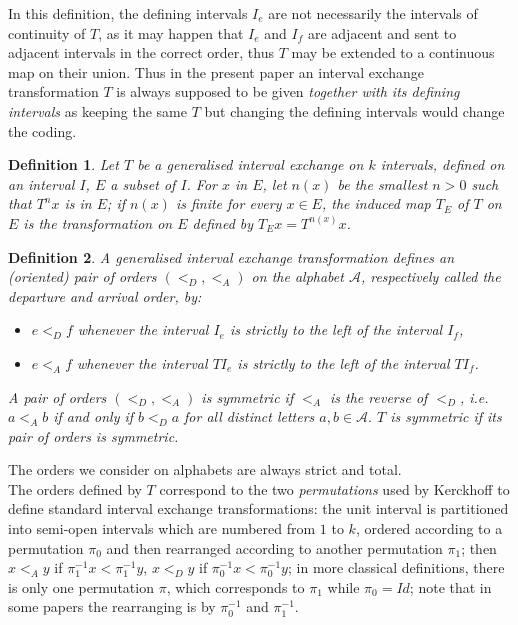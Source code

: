 \documentclass[12pt,a4paper]{amsart}
\newtheorem{definition}{Definition}
\begin{document}
In this definition, the defining intervals $I_e$ are not necessarily the intervals of continuity of $T$, as it may happen that $I_e$ and $I_f$ are adjacent and sent to adjacent intervals in the correct order, thus $T$ may be extended to a continuous map on their union. Thus in the present paper an interval exchange transformation $T$ is always supposed to be given {\em together with its defining intervals} as keeping the same $T$ but changing the defining intervals would change the coding.

  \begin{definition}
  Let $T$ be a generalised  interval exchange on $k$ intervals, defined on
 an interval $I$, $E$ a subset of $I$. For $x$ in $E$, let $n(x)$ be the smallest $n>0$ such that $T^nx$ is in $E$;  if $n(x)$ is finite for 
 every $x\in E$, the {\em induced map} $T_{E}$ of $T$ on $E$ is the transformation on $E$ defined by $T_Ex=T^{n(x)}x$.
 \end{definition}

 
 \begin{definition}\label{diord} A generalised interval exchange transformation defines an (oriented) pair of  orders $(<_D, <_A)$   on the alphabet  $\mathcal  A$, respectively called the departure and arrival order, by:
\begin{itemize}
\item $e<_D f$ whenever the interval $I_e$ is strictly to the left of the interval $I_f$,
\item $e<_A f$ whenever the interval $TI_e$ is strictly to the left of the interval $TI_f$.
\end{itemize}
A pair of orders $(<_D, <_A)$ is {\em symmetric} if $<_A$ is the reverse of $<_D$,  i.e.   $a<_A b$ if and only if $b<_D a$ for all distinct letters $a, b\in \mathcal A.$
$T$ is {\em symmetric} if  its pair of orders is symmetric.
\end{definition}
 The orders we consider on alphabets are always strict and total.\\
The orders defined by $T$ correspond to the two {\it permutations} used by Kerckhoff \cite{ker} to define
 standard interval exchange transformations: the unit interval is partitioned into semi-open intervals
which are numbered from $1$ to $k$, ordered according to a permutation  $\pi_0$ and then rearranged according to another permutation  $\pi_1$; then  $x<_A y$ if $\pi_1^{-1} x< \pi_1^{-1}  y$, $x<_D y$ if $\pi_0^{-1} x< \pi_0^{-1}  y$; in more classical definitions, there is only one permutation $\pi$, which corresponds to $\pi_1$ while $\pi_0=Id$; note that in some papers the rearranging is by $\pi_0^{-1}$ and $\pi_1^{-1}$.
\end{document}
